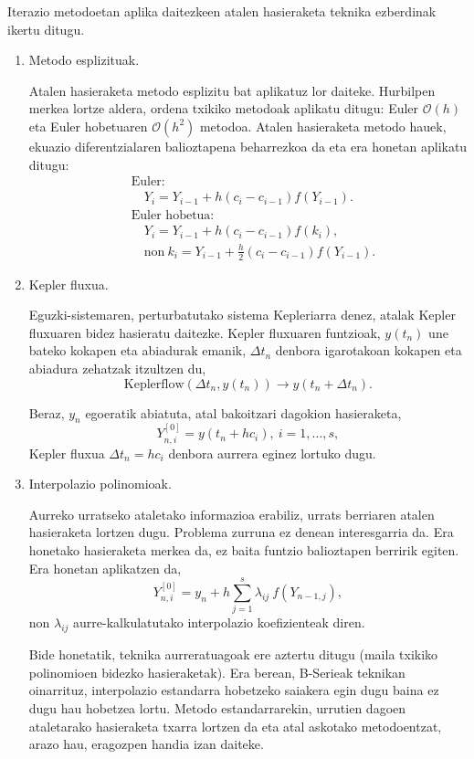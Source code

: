 Iterazio metodoetan aplika daitezkeen atalen hasieraketa teknika ezberdinak ikertu ditugu. 
\begin{enumerate}
\item Metodo esplizituak.

Atalen hasieraketa metodo esplizitu bat aplikatuz lor daiteke. Hurbilpen merkea lortze aldera, ordena txikiko metodoak aplikatu ditugu: 
Euler  $\mathcal{O}(h)$ eta Euler hobetuaren $\mathcal{O}(h^2)$ metodoa. Atalen hasieraketa metodo hauek, ekuazio diferentzialaren balioztapena beharrezkoa da eta era honetan aplikatu ditugu:
\begin{align*}
&\text{Euler}:\\
& \quad Y_i=Y_{i-1}+h (c_i-c_{i-1}) f(Y_{i-1}).\\
&\text{Euler hobetua}: \\
& \quad Y_i=Y_{i-1}+h (c_i-c_{i-1}) f(k_i),\\
& \quad \text{non} \ k_i=Y_{i-1}+\frac{h}{2} (c_i-c_{i-1}) f(Y_{i-1}).
\end{align*} 


\item Kepler fluxua.

Eguzki-sistemaren, perturbatutako sistema Kepleriarra denez, atalak Kepler fluxuaren bidez hasieratu daitezke. Kepler fluxuaren funtzioak, $y(t_n)$ une bateko kokapen eta abiadurak emanik, $\Delta t_n$ denbora igarotakoan kokapen eta abiadura zehatzak itzultzen du,
\begin{equation*}
\text{Keplerflow}(\Delta t_n, y(t_n)) \rightarrow y(t_n+\Delta t_n).
\end{equation*}

Beraz, $y_n$ egoeratik abiatuta, atal bakoitzari dagokion hasieraketa,
\begin{equation*}
Y_{n,i}^{[0]}=y(t_n+hc_i), \ i=1,\dots,s,
\end{equation*}
Kepler fluxua $\Delta t_n=hc_i$ denbora aurrera eginez lortuko dugu.  

\item Interpolazio polinomioak.

Aurreko urratseko ataletako informazioa erabiliz, urrats berriaren atalen hasieraketa lortzen dugu. Problema zurruna ez denean interesgarria da. Era honetako hasieraketa merkea da, ez baita funtzio balioztapen berririk egiten. Era honetan aplikatzen da,
\begin{equation*}
Y_{n,i}^{[0]}=y_n+h \sum_{j=1}^{s} \lambda_{ij} \ f(Y_{n-1,j}),
\end{equation*}
non $\lambda_{ij}$ aurre-kalkulatutako interpolazio koefizienteak diren. 


Bide honetatik, teknika aurreratuagoak ere aztertu ditugu (maila txikiko polinomioen bidezko hasieraketak). Era berean, B-Serieak \cite{Chartier2010} teknikan oinarrituz, interpolazio estandarra \cite{Laburta1998} hobetzeko saiakera egin dugu baina ez dugu hau hobetzea lortu. Metodo estandarrarekin, urrutien dagoen ataletarako hasieraketa txarra lortzen da eta atal askotako metodoentzat, arazo hau, eragozpen handia izan daiteke.  

\end{enumerate}

